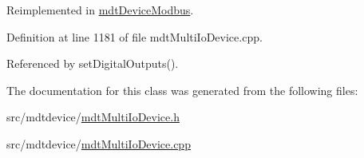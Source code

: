 Reimplemented in \hyperlink{classmdt_device_modbus_a6713edaee0bfba48791008124299b753}{mdt\-Device\-Modbus}.



Definition at line 1181 of file mdt\-Multi\-Io\-Device.\-cpp.



Referenced by set\-Digital\-Outputs().



The documentation for this class was generated from the following files\-:\begin{DoxyCompactItemize}
\item 
src/mdtdevice/\hyperlink{mdt_multi_io_device_8h}{mdt\-Multi\-Io\-Device.\-h}\item 
src/mdtdevice/\hyperlink{mdt_multi_io_device_8cpp}{mdt\-Multi\-Io\-Device.\-cpp}\end{DoxyCompactItemize}

